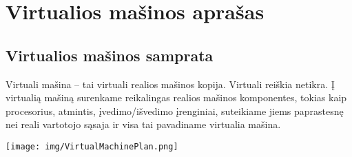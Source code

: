 \section{Virtualios mašinos aprašas}

\subsection{Virtualios mašinos samprata}

Virtuali mašina – tai virtuali realios mašinos kopija. Virtuali reiškia netikra. Į virtualią mašiną surenkame reikalingas realios mašinos komponentes, tokias kaip procesorius, atmintis, įvedimo/išvedimo įrenginiai, suteikiame jiems paprastesnę nei reali vartotojo sąsaja ir visa tai pavadiname virtualia mašina.

\texttt{[image: img/VirtualMachinePlan.png]}

